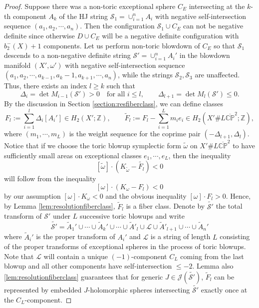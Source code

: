 \documentclass[11pt]{article}
\theoremstyle{definition}
\theoremstyle{remark}
\newcommand{\CP}{\mathbb{CP}}
\newcommand{\st}{\mathcal{S}}
\begin{document}
\begin{proof}
  Suppose there was a non-toric exceptional sphere $C_E$ intersecting at the $k$-th component $A_k$ of the HJ string $\st_1=\cup_{i=1}^{n} A_i$ with negative self-intersection sequence $(a_1,a_2,\cdots,a_{n})$. Then the configuration $\st_1\cup C_E$ can not be negative definite since otherwise $D\cup C_E$ will be a negative definite configuration with $b_2^-(X)+1$ components. Let us perform non-toric blowdown of $C_E$ so that $\st_1$ descends to a non-negative definite string $\st'=\cup_{i=1}^nA_i'$ in the blowdown manifold $(X',\omega')$ with negative self-intersection sequence $(a_1,a_2,\cdots,a_{k-1},a_k-1,a_{k+1},\cdots,a_n)$, while the strings $\st_2,\st_3$ are unaffected. Thus, there exists an index $l\ge k$ such that
\[
  \Delta_i=\det M_{i-1}(\st') > 0 \quad \text{for all } i \le l,
  \qquad
  \Delta_{l+1}=\det M_{l}(\st') \le 0.
\]
By the discussion in Section \ref{section:resfiberclass}, we can  define classes \[F_l:=\sum_{i=1}^l\Delta_i[A_i']\in H_2(X';\mathbb{Z}),\qquad \tilde{F}_l:=F_l-\sum_{i=1}^Lm_ie_i\in H_2(X'\# L\overline{\CP}^2;\mathbb{Z}),\]
where $(m_1,\cdots,m_L)$ is the weight sequence for the coprime pair $(-\Delta_{l+1},\Delta_{l})$. Notice that if we choose the toric blowup symplectic form $\tilde{\omega}$ on $X'\# L\overline{\CP}^2$ to have sufficiently small areas on exceptional classes $e_1,\cdots,e_L$, then the inequality
\[[\tilde{\omega}]\cdot(K_{\tilde{\omega}}-\tilde{F_l})<0\]
will follow from the inequality
\[[\omega]\cdot(K_{\omega}-F_l)<0\] by our assumption $[\omega]\cdot K_{\omega}<0$ and the obvious inequality $[\omega]\cdot F_l>0$.
Hence, by Lemma \ref{lem:resolutionfiberclass}, $\tilde{F}_l$ is a fiber class. Denote by $\tilde{\st'}$ the total transform of $\st'$ under $L$ successive toric blowups and write
\[\tilde{\st'}=\tilde{A}_1'\cup\cdots\cup\tilde{A}_k'\cup\cdots\cup\tilde{A}'_{l}\cup \mathcal{L}\cup\tilde{A}'_{l+1}\cup \cdots\cup\tilde{A}_n'\]
where $\tilde{A}_i'$ is the proper transform of $A_i'$ and $\mathcal{L}$ is a string of length $L$ consisting of the proper transforms of exceptional spheres in the process of toric blowups. Note that $\mathcal{L}$ will contain a unique $(-1)$-component $C_L$ coming from the last blowup and all other components have self-intersection $\leq -2$. Lemma also \ref{lem:resolutionfiberclass} guarantees that for generic $J\in\mathcal{J}(\tilde{\st'})$, $\tilde{F}_l$ can be represented by embedded $J$-holomorphic spheres intersecting $\tilde{\st'}$ exactly once at the $C_L$-component.


\end{proof}
\end{document}
